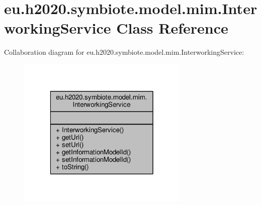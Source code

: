 \hypertarget{classeu_1_1h2020_1_1symbiote_1_1model_1_1mim_1_1InterworkingService}{}\section{eu.\+h2020.\+symbiote.\+model.\+mim.\+Interworking\+Service Class Reference}
\label{classeu_1_1h2020_1_1symbiote_1_1model_1_1mim_1_1InterworkingService}


Collaboration diagram for eu.\+h2020.\+symbiote.\+model.\+mim.\+Interworking\+Service\+:
\nopagebreak
\begin{figure}[H]
\begin{center}
\leavevmode
\includegraphics[width=232pt]{classeu_1_1h2020_1_1symbiote_1_1model_1_1mim_1_1InterworkingService__coll__graph}
\end{center}
\end{figure}
